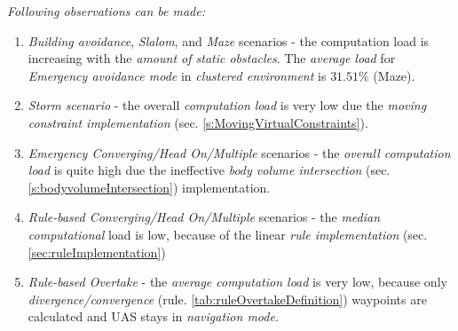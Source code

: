 \noindent \emph{Following observations can be made:}

\begin{enumerate}
    \item \emph{Building avoidance}, \emph{Slalom}, and \emph{Maze} scenarios - the computation load is increasing with the \emph{amount of static obstacles}. The \emph{average load} for \emph{Emergency avoidance mode} in \emph{clustered environment} is $31.51\%$ (Maze).
    
    \item \emph{Storm scenario} - the overall \emph{computation load} is very low due the \emph{moving constraint implementation} (sec. \ref{s:MovingVirtualConstraints}).
    
    \item\emph{Emergency Converging/Head On/Multiple} scenarios - the \emph{overall computation load} is quite high due the ineffective \emph{body volume intersection} (sec. \ref{s:bodyvolumeIntersection}) implementation.
    
    \item \emph{Rule-based Converging/Head On/Multiple} scenarios - the \emph{median computational} load is low, because of the linear \emph{rule implementation} (sec. \ref{sec:ruleImplementation})
    
    \item \emph{Rule-based Overtake} - the \emph{average computation load} is very low, because only \emph{divergence/convergence} (rule. \ref{tab:ruleOvertakeDefinition}) waypoints are calculated and UAS stays in \emph{navigation mode}.
\end{enumerate}